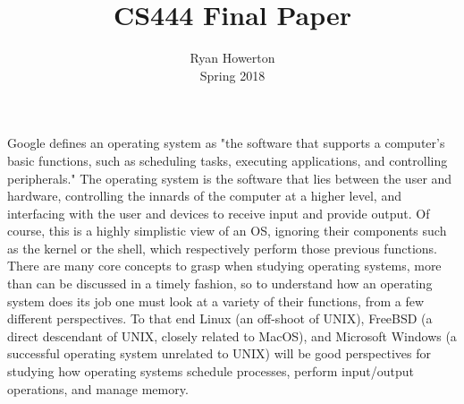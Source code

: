\documentclass[10pt,draftclsnofoot,onecolumn]{IEEEtran}
\title{CS444 Final Paper}
\author{Ryan Howerton \\ Spring 2018}
\begin{document}
	\maketitle
    \newpage
    
    Google defines an operating system as "the software that supports a computer's basic functions, such as scheduling tasks, executing applications, and controlling peripherals." The operating system is the software that lies between the user and hardware, controlling the innards of the computer at a higher level, and interfacing with the user and devices to receive input and provide output. Of course, this is a highly simplistic view of an OS, ignoring their components such as the kernel or the shell, which respectively perform those previous functions. There are many core concepts to grasp when studying operating systems, more than can be discussed in a timely fashion, so to understand how an operating system does its job one must look at a variety of their functions, from a few different perspectives. To that end Linux (an off-shoot of UNIX), FreeBSD (a direct descendant of UNIX, closely related to MacOS), and Microsoft Windows (a successful operating system unrelated to UNIX) will be good perspectives for studying how operating systems schedule processes, perform input/output operations, and manage memory.\par
    
\end{document}
